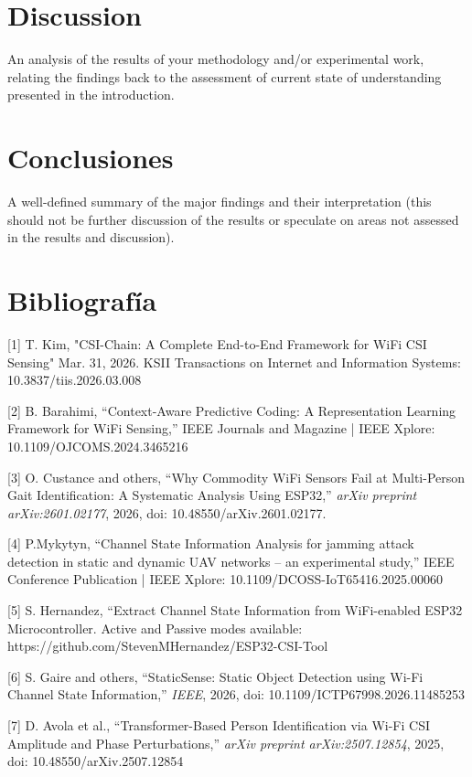 \documentclass[12pt, a4paper]{article}
\begin{document}
\section{Discussion}
An analysis of the results of your methodology and/or experimental work, relating the findings back to the assessment of current state of understanding presented in the introduction.






\section{Conclusiones}
A well-defined summary of the major findings and their interpretation (this should not be further discussion of the results or speculate on areas not assessed in the results and discussion).



\section{Bibliografía}

[1] T. Kim, "CSI-Chain: A Complete End-to-End Framework for WiFi CSI Sensing" Mar. 31, 2026. KSII Transactions on Internet and Information Systems: 10.3837/tiis.2026.03.008

[2] B. Barahimi, “Context-Aware Predictive Coding: A Representation Learning Framework for WiFi Sensing,” IEEE Journals and Magazine | IEEE Xplore: 10.1109/OJCOMS.2024.3465216

[3] O. Custance and others, “Why Commodity WiFi Sensors Fail at Multi-Person Gait Identification: A Systematic Analysis Using ESP32,” \emph{arXiv preprint arXiv:2601.02177}, 2026, doi: 10.48550/arXiv.2601.02177.

[4] P.Mykytyn, “Channel State Information Analysis for jamming attack detection in static and dynamic UAV networks – an experimental study,” IEEE Conference Publication | IEEE Xplore: 10.1109/DCOSS-IoT65416.2025.00060


[5] S. Hernandez, “Extract Channel State Information from WiFi-enabled ESP32 Microcontroller. Active and Passive modes available: https://github.com/StevenMHernandez/ESP32-CSI-Tool

[6] S. Gaire and others, “StaticSense: Static Object Detection using Wi-Fi Channel State Information,” \emph{IEEE}, 2026, doi: 10.1109/ICTP67998.2026.11485253

[7] D. Avola et al., “Transformer-Based Person Identification via Wi-Fi CSI Amplitude and Phase Perturbations,” \emph{arXiv preprint arXiv:2507.12854}, 2025, doi: 10.48550/arXiv.2507.12854

%
%
\end{document}

